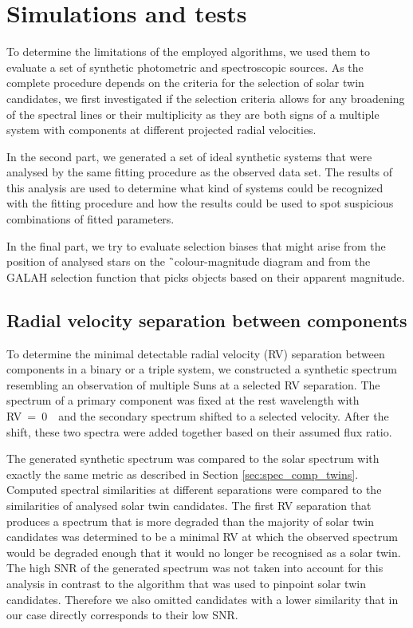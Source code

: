 \section{Simulations and tests}
\label{sec:simulations}
To determine the limitations of the employed algorithms, we used them to evaluate a set of synthetic photometric and spectroscopic sources. As the complete procedure depends on the criteria for the selection of solar twin candidates, we first investigated if the selection criteria allows for any broadening of the spectral lines or their multiplicity as they are both signs of a multiple system with components at different projected radial velocities.

In the second part, we generated a set of ideal synthetic systems that were analysed by the same fitting procedure as the observed data set. The results of this analysis are used to determine what kind of systems could be recognized with the fitting procedure and how the results could be used to spot suspicious combinations of fitted parameters. 

In the final part, we try to evaluate selection biases that might arise from the position of analysed stars on the \G\ colour-magnitude diagram and from the GALAH selection function that picks objects based on their apparent magnitude.

\subsection{Radial velocity separation between components}
\label{sec:rv_sep_sim}
To determine the minimal detectable radial velocity (RV) separation between components in a binary or a triple system, we constructed a synthetic spectrum resembling an observation of multiple Suns at a selected RV separation. The spectrum of a primary component was fixed at the rest wavelength with RV~=~0~\kms\, and the secondary spectrum shifted to a selected velocity. After the shift, these two spectra were added together based on their assumed flux ratio. 

The generated synthetic spectrum was compared to the solar spectrum with exactly the same metric as described in Section \ref{sec:spec_comp_twins}. Computed spectral similarities at different separations were compared to the similarities of analysed solar twin candidates. The first RV separation that produces a spectrum that is more degraded than the majority of solar twin candidates was determined to be a minimal RV at which the observed spectrum would be degraded enough that it would no longer be recognised as a solar twin. The high SNR of the generated spectrum was not taken into account for this analysis in contrast to the algorithm that was used to pinpoint solar twin candidates. Therefore we also omitted candidates with a lower similarity that in our case directly corresponds to their low SNR. 

